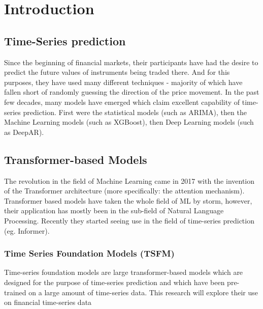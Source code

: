 \section{Introduction} 

\subsection{Time-Series prediction}
Since the beginning of financial markets, their participants have had the desire to predict the future values of instruments being traded there. And for this purposes, they have used many different techniques - majority of which have fallen short of randomly guessing the direction of the price movement. In the past few decades, many models have emerged which claim excellent capability of time-series prediction. First were the statistical models (such as ARIMA), then the Machine Learning models (such as XGBoost), then Deep Learning models (such as DeepAR). 

\subsection{Transformer-based Models}

The revolution in the field of Machine Learning came in 2017 with the invention of the Transformer architecture (more specifically: the attention mechanism). Transformer based models have taken the whole field of ML by storm, however, their application has mostly been in the sub-field of Natural Language Processing. Recently they started seeing use in the field of time-series prediction (eg. Informer). 

\subsubsection{Time Series Foundation Models (TSFM)}

Time-series foundation models are large transformer-based models which are designed for the purpose of time-series prediction and which have been pre-trained on a large amount of time-series data. This research will explore their use on financial time-series data



